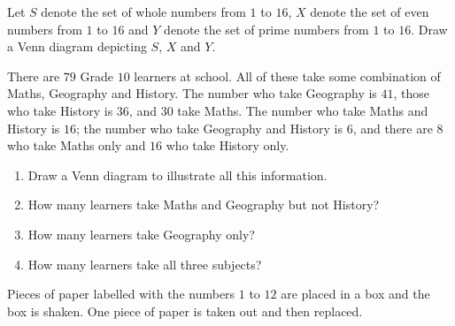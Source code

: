 \begin{exercises}{}{
  \item Let $S$ denote the set of whole numbers from $1$ to $16$, $X$
    denote the set of even numbers from $1$ to $16$ and $Y$ denote the
    set of prime numbers from $1$ to $16$. Draw a Venn diagram depicting $S$, $X$ and $Y$.
\item
  There are $79$ Grade $10$ learners at school. All of these
    take some combination of Maths, Geography and History. The number who take
    Geography is $41$, those who take History is $36$, and $30$ take
    Maths. The number who take Maths and History is $16$; the number
    who take Geography and History is $6$, and there are $8$ who take
    Maths only and $16$ who take History only.
    \begin{enumerate}[noitemsep, label=\textbf{(\alph*)} ]

    \item Draw a Venn diagram to illustrate all this information.
    \item How many learners take Maths and Geography but not History?
    \item How many learners take Geography only?
    \item How many learners take all three subjects?
    \end{enumerate}
 \item Pieces of paper labelled with the numbers $1$ to $12$ are
    placed in a box and the box is shaken. One piece of paper is taken
    out and then replaced.
    \begin{enumerate}[noitemsep, label=\textbf{(\alph*)} ]


\end{enumerate}}
\end{exercises}
